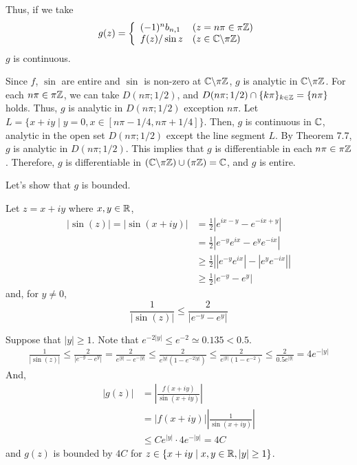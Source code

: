 Thus, if we take
\[g(z) = \left\{
  \begin{array}{ll}
    (-1)^n b_{n,1} & (z = n\pi \in \pi\bbZ) \\
    f(z) / \sin z & (z \in \bbC \bs \pi\bbZ)
  \end{array}
\right.\]
\(g\) is continuous.

Since \(f\), \(\sin\) are entire and \(\sin\) is non-zero at \(\bbC \bs \pi\bbZ\), \(g\) is analytic in \(\bbC \bs \pi\bbZ\).
For each \(n\pi \in \pi\mathbb{Z}\), we can take \(D(n\pi; 1/2)\),
and \(D(n\pi; 1/2) \cap \{k\pi\}_{k \in \mathbb{Z}} = \{n\pi\}\) holds.
Thus, \(g\) is analytic in \(D(n\pi; 1/2)\) exception \(n\pi\).
Let \(L = \{x + iy \mid y = 0, x \in [n\pi - 1/4, n\pi + 1/4]\}\).
Then, \(g\) is continuous in \(\mathbb{C}\), analytic in the open set \(D(n\pi; 1/2)\) except the line segment \(L\).
By Theorem 7.7, \(g\) is analytic in \(D(n\pi; 1/2)\).
This implies that \(g\) is differentiable in each \(n\pi \in \pi\mathbb{Z}\).
Therefore, \(g\) is differentiable in \((\bbC \bs \pi\bbZ) \cup (\pi\bbZ) = \bbC\),
and \(g\) is entire.

Let's show that \(g\) is bounded.

Let \(z = x + iy\) where \(x, y \in \mathbb{R}\),
\begin{align*}
  |\sin(z)| = 
  |\sin(x + iy)|
  &= \frac{1}{2} \left| e^{ix - y} - e^{-ix + y} \right|
  \\&= \frac{1}{2} \left| e^{-y} e^{ix} - e^{y} e^{-ix} \right|
  \\&\ge \frac{1}{2} \left| |e^{-y} e^{ix}| - |e^{y} e^{-ix}| \right|
  \\&\ge \frac{1}{2} \left| e^{-y} - e^{y} \right|
\end{align*}
and, for \(y \neq 0\),
\[\frac{1}{|\sin(z)|} \le \frac{2}{\left| e^{-y} - e^{y} \right|}\]

Suppose that \(|y| \ge 1\).
Note that \(e^{-2|y|} \le e^{-2} \simeq 0.135 < 0.5\).
\begin{align*}
  \frac{1}{|\sin(z)|}
  \le \frac{2}{\left| e^{-y} - e^{y} \right|}
  = \frac{2}{ e^{|y|} - e^{-|y|} }
  \le \frac{2}{e^{|y|} (1 - e^{-2|y|})}
  \le \frac{2}{e^{|y|} (1 - e^{-2})}
  \le \frac{2}{0.5 e^{|y|}} = 4e^{-|y|}
\end{align*}
And,
\begin{align*}
  |g(z)|
  &= \left| \frac{f(x + iy)}{\sin (x + iy)} \right|
  \\&= |f(x + iy)| \left| \frac{1}{\sin (x + iy)} \right|
  \\&\le Ce^{|y|} \cdot 4e^{-|y|} = 4C
\end{align*}
and \(g(z)\) is bounded by \(4C\) for \(z \in \{x + iy \mid x, y \in \mathbb{R}, |y| \ge 1\}\).

